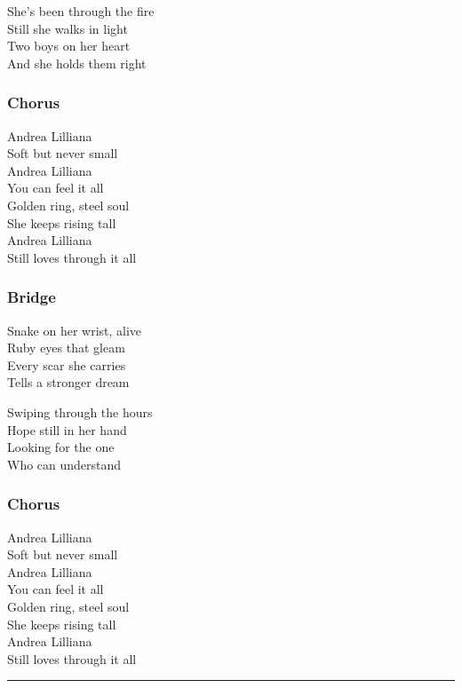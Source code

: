 \documentclass[]{article}
\begin{document}
She's been through the fire\\
Still she walks in light\\
Two boys on her heart\\
And she holds them right

\subsubsection{Chorus}\label{chorus-23}

Andrea Lilliana\\
Soft but never small\\
Andrea Lilliana\\
You can feel it all\\
Golden ring, steel soul\\
She keeps rising tall\\
Andrea Lilliana\\
Still loves through it all

\subsubsection{Bridge}\label{bridge-5}

Snake on her wrist, alive\\
Ruby eyes that gleam\\
Every scar she carries\\
Tells a stronger dream

Swiping through the hours\\
Hope still in her hand\\
Looking for the one\\
Who can understand

\subsubsection{Chorus}\label{chorus-24}

Andrea Lilliana\\
Soft but never small\\
Andrea Lilliana\\
You can feel it all\\
Golden ring, steel soul\\
She keeps rising tall\\
Andrea Lilliana\\
Still loves through it all

\begin{center}\rule{0.5\linewidth}{0.5pt}\end{center}
\end{document}
